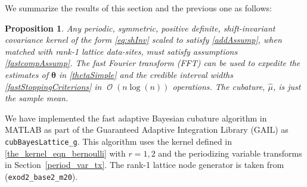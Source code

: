 \documentclass{iitthesis}          %
\DeclareMathOperator{\Order}{{\mathcal O}}
\newtheorem{prop}{Proposition}
\newcommand{\bm}[1]{\boldsymbol{#1}}
\newcommand{\rlambda}{\mathring{\lambda}}
\newcommand{\vtheta}{{\bm{\theta}}}
\newcommand{\hmu}{\widehat{\mu}}
\newcommand{\MLE}{\textup{MLE}}
\newcommand{\GCV}{\textup{GCV}}
\newcommand{\err}{\textup{err}}
\newcommand{\code}[1]{\texttt{#1}}
\def\abs#1{\ensuremath{\left \lvert #1 \right \rvert}}
\newcommand\secref{Section~\ref}
\begin{document}

We summarize the results of this section and the previous one as follows:
\begin{prop}
Any periodic, symmetric, positive definite, shift-invariant covariance kernel of the form \eqref{eq:shInv} scaled to satisfy \eqref{addAssump}, when matched with rank-1 lattice data-sites, must satisfy assumptions \eqref{fastcompAssump}.  The \emph{fast Fourier transform} (FFT) can be used to expedite the estimates of $\vtheta$ in \eqref{thetaSimple} and the credible interval widths \eqref{fastStoppingCriterions} in $\Order(n \log(n))$ operations. The cubature, $\hmu$, is just the sample mean.
\end{prop}

We have implemented the fast adaptive Bayesian cubature algorithm in MATLAB as part of the Guaranteed Adaptive Integration Library (GAIL) \cite{ChoEtal17b} as \allowbreak \code{cubBayesLattice\_g}. This algorithm uses the kernel defined in  \eqref{the_kernel_eqn_bernoulli} with  $r=1,2$ and the periodizing variable transforms in \secref{period_var_tx}. The rank-1 lattice node generator is taken from \cite{NuyMagic} (\code{exod2\_base2\_m20}).
\end{document}
